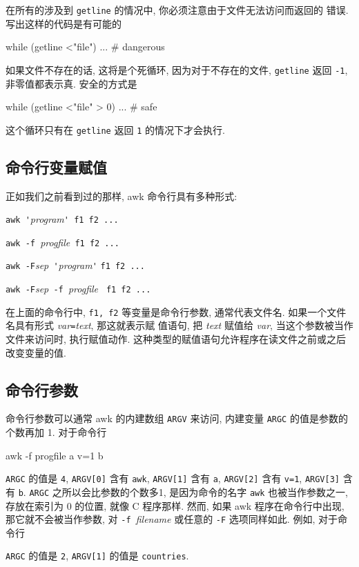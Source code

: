 在所有的涉及到 \verb'getline' 的情况中, 你必须注意由于文件无法访问而返回的
错误. 写出这样的代码是有可能的
\begin{myverb}
    while (getline <"file") ...     # dangerous
\end{myverb}
如果文件不存在的话, 这将是个死循环, 因为对于不存在的文件, \verb'getline'
返回 \verb'-1', 非零值都表示真. 安全的方式是
\begin{myverb}
    while (getline <"file" > 0) ...     # safe
\end{myverb}
这个循环只有在 \verb'getline' 返回 \texttt{1} 的情况下才会执行.

\subsection{命令行变量赋值}
\label{subsec:command_line_variable_assignments}

正如我们之前看到过的那样, awk 命令行具有多种形式:
\begin{pattern}
    \indent\verb"awk '"\textit{program}\verb"' f1 f2 ..." \par
    \indent\verb"awk -f "\textit{progfile}\verb" f1 f2 ..." \par
    \indent\verb"awk -F"\textit{sep}\verb" '"\textit{program}\verb"'"
    \verb"f1 f2 ..." \par
    \indent\verb"awk -F"\textit{sep}\verb" -f "\textit{progfile}
        \verb" f1 f2 ..." \par
\end{pattern}
在上面的命令行中, \verb'f1, f2' 等变量是命令行参数, 通常代表文件名.
如果一个文件名具有形式 \textit{var}\verb'='\textit{text}, 那这就表示赋
值语句, 把 \textit{text} 赋值给 \textit{var}, 当这个参数被当作文件来访问时,
执行赋值动作. 这种类型的赋值语句允许程序在读文件之前或之后改变变量的值.

\subsection{命令行参数}
\label{subsec:command_line_arguments}

命令行参数可以通常 awk 的内建数组 \verb'ARGV' 来访问, 内建变量 \verb'ARGC'
的值是参数的个数再加 1. 对于命令行
\begin{myverb}
    awk -f progfile a v=1 b
\end{myverb}
\verb'ARGC' 的值是 \verb'4', \verb'ARGV[0]' 含有 \verb'awk', \verb'ARGV[1]'
含有 \verb'a', \verb'ARGV[2]' 含有 \verb'v=1', \verb'ARGV[3]' 含有
\verb'b'. \verb'ARGC' 之所以会比参数的个数多1, 是因为命令的名字 \verb'awk'
也被当作参数之一, 存放在索引为 0 的位置, 就像 C 程序那样. 然而, 如果 awk
程序在命令行中出现, 那它就不会被当作参数, 对 \verb'-f '\textit{filename}
或任意的 \verb'-F' 选项同样如此. 例如, 对于命令行
\verb'ARGC' 的值是 \verb'2', \verb'ARGV[1]' 的值是 \verb'countries'.


